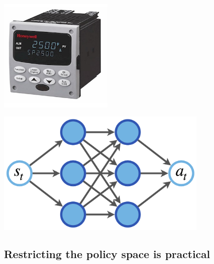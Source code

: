 \documentclass[
  letterpaper,
  DIV=11,
  numbers=noendperiod,
  oneside]{scrartcl}
\begin{document}
\begin{center}
\includegraphics[width=\textwidth,height=2.1875in]{figs/Honey_UDC.jpg}
\end{center}

\begin{center}
\includegraphics[width=\textwidth,height=2.39583in]{figs/nn.png}
\end{center}

\subsection{Restricting the policy space is
practical}\label{restricting-the-policy-space-is-practical}
\end{document}
